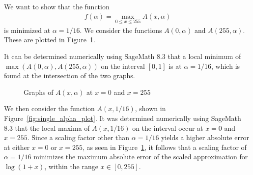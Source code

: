 We want to show that the function
\begin{align*}
	f(\alpha) = \max_{0\leq x \leq 255}{A(x,\alpha)}
\end{align*}
is minimized at $\alpha = 1/16$.
We consider the functions $A(0,\alpha)$ and $A(255,\alpha)$. These are plotted in Figure~\ref{fig:endpoint_plot}.

It can be determined numerically using SageMath 8.3 that a local minimum of $\max(A(0,\alpha),A(255,\alpha))$ on the interval $[0,1]$ is at $\alpha = 1/16$, which is found at the intersection of the two graphs.
\begin{figure}[!ht]
	\centering
	\caption{Graphs of $A(x,\alpha)$ at $x=0$ and $x=255$}
	\label{fig:endpoint_plot}
\end{figure}
We then consider the function $A(x,1/16)$, shown in Figure~\ref{fig:single_alpha_plot}.
It was determined numerically using SageMath 8.3 that the local maxima of $A(x,1/16)$ on the interval occur at $x=0$ and $x=255$. Since a scaling factor other than $\alpha=1/16$ yields a higher absolute error at either $x=0$ or $x=255$, as seen in Figure~\ref{fig:endpoint_plot}, it follows that a scaling factor of $\alpha = 1/16$ minimizes the maximum absolute error of the scaled approximation for $\log{(1+x)}$, within the range $x \in [0, 255]$.
